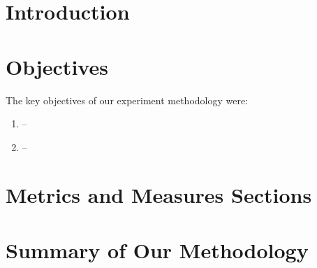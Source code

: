 \section{Introduction}



\section{Objectives} \label{sec:Method:Objectives}
The key objectives of our experiment methodology were:
\begin{enumerate}
	\item {} -- 
	
	\item {} -- 
	
\end{enumerate}


\section{Metrics and Measures Sections}



\section{Summary of Our Methodology}
